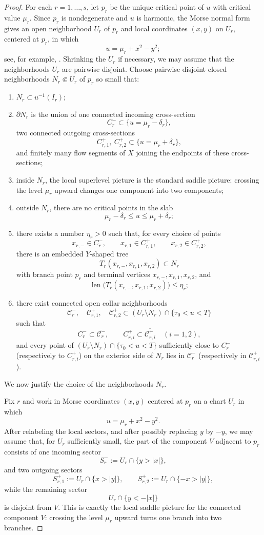 \documentclass[12pt]{amsart}
\theoremstyle{definition}
\theoremstyle{remark}
\begin{document}
\begin{proof}
\indent For each $r=1,\dots,s$, let $p_r$ be the unique critical point of $u$ with critical value $\mu_r$. Since $p_r$ is
nondegenerate and $u$ is harmonic, the Morse normal form gives an open neighborhood $U_r$ of $p_r$ and local coordinates $(x,y)$ on $U_r$, centered at
$p_r$, in which
\[
 u=\mu_r+x^2-y^2;
\]
see, for example, \cite{Milnor1963}. Shrinking the $U_r$ if necessary, we may assume that the neighborhoods $U_r$ are pairwise disjoint. Choose pairwise disjoint closed neighborhoods $N_r\Subset U_r$ of $p_r$ so small that:
\begin{enumerate}
\item[(i)] $N_r\subset u^{-1}(I_r)$;
\item[(ii)] $\partial N_r$ is the union of one connected incoming cross-section
\[
 C_r^-\subset\{u=\mu_r-\delta_r\},
\]
two connected outgoing cross-sections
\[
 C_{r,1}^+,\ C_{r,2}^+\subset\{u=\mu_r+\delta_r\},
\]
and finitely many flow segments of $X$ joining the endpoints of these cross-sections;
\item[(iii)] inside $N_r$, the local superlevel picture is the standard saddle picture: crossing the level $\mu_r$
      upward changes one component into two components;
\item[(iv)] outside $N_r$, there are no critical points in the slab
\[
 \mu_r-\delta_r\le u\le \mu_r+\delta_r;
\]
\item[(v)] there exists a number $\eta_r>0$ such that, for every choice of points
\[
x_{r,-}\in C_r^-,
\qquad
x_{r,1}\in C_{r,1}^+,
\qquad
x_{r,2}\in C_{r,2}^+,
\]
there is an embedded $Y$-shaped tree
\[
T_r(x_{r,-},x_{r,1},x_{r,2})\subset N_r
\]
with branch point $p_r$ and terminal vertices $x_{r,-},x_{r,1},x_{r,2}$, and
\[
\operatorname{len}\bigl(T_r(x_{r,-},x_{r,1},x_{r,2})\bigr)\le \eta_r;
\]
\item[(vi)] there exist connected open collar neighborhoods
\[
\mathcal C_r^-,
\quad
\mathcal C_{r,1}^+,
\quad
\mathcal C_{r,2}^+
\subset (U_r\setminus N_r)\cap\{\tau_0<u<T\}
\]
such that
\[
C_r^- \subset \overline{\mathcal C_r^-},
\qquad
C_{r,i}^+ \subset \overline{\mathcal C_{r,i}^+} \quad (i=1,2),
\]
and every point of $(U_r\setminus N_r)\cap\{\tau_0<u<T\}$ sufficiently close to $C_r^-$
(respectively to $C_{r,i}^+$) on the exterior side of $N_r$ lies in $\mathcal C_r^-$
(respectively in $\mathcal C_{r,i}^+$).
\end{enumerate}
We now justify the choice of the neighborhoods $N_r$.

Fix $r$ and work in Morse coordinates $(x,y)$ centered at $p_r$ on a chart $U_r$ in which
\[
u=\mu_r+x^2-y^2.
\]
After relabeling the local sectors, and after possibly replacing $y$ by $-y$, we may assume that,
for $U_r$ sufficiently small, the part of the component $V$ adjacent to $p_r$ consists of one
incoming sector
\[
S_r^-:=U_r\cap\{y>|x|\},
\]
and two outgoing sectors
\[
S_{r,1}^+:=U_r\cap\{x>|y|\},
\qquad
S_{r,2}^+:=U_r\cap\{-x>|y|\},
\]
while the remaining sector
\[
U_r\cap\{y<-|x|\}
\]
is disjoint from $V$. This is exactly the local saddle picture for the connected component $V$:
crossing the level $\mu_r$ upward turns one branch into two branches.


\end{proof}
\end{document}

